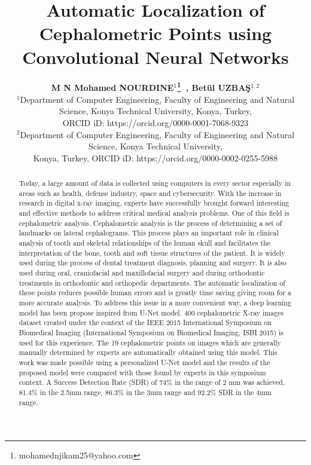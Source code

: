 \documentclass{elektr}
\title{Automatic Localization of Cephalometric Points using Convolutional Neural Networks}
\author[M N Mohamed NOURDINE and Betül UZBAŞ]{
\textbf{M N Mohamed NOURDINE$^{1}$\thanks{mohamednjikam25@yahoo.com}~, Betül UZBAŞ$^{1,2}$}\\
$^{1}$Department of Computer Engineering, Faculty of Engineering and Natural Science, Konya Technical University, Konya, Turkey, \\ ORCID iD: https://orcid.org/0000-0001-7068-9323\\
$^{2}$Department of Computer Engineering, Faculty of Engineering and Natural Science, Konya Technical University,\\ Konya, Turkey, ORCID iD: https://orcid.org/0000-0002-0255-5988
\\ [1.8em]

\rec{.201}
\acc{.201}
\finv{..201}
}
\begin{document}
\maketitle


\begin{abstract}Today, a large amount of data is collected using computers in every sector especially in areas such as health, defense industry, space and cybersecurity. With the increase in research in digital x-ray imaging, experts have successfully brought forward interesting and effective methods to address critical medical analysis problems. One of this field is cephalometric analysis. Cephalometric analysis is the process of determining a set of landmarks on lateral cephalograms. This process plays an important role in clinical analysis of tooth and skeletal relationships of the human skull and facilitates the interpretation of the bone, tooth and soft tissue structures of the patient. It is widely used during the process of dental treatment diagnosis, planning and surgery. It is also used during oral, craniofacial and maxillofacial surgery and during orthodontic treatments in orthodontic and orthopedic departments. The automatic localization of these points reduces possible human errors and is greatly time saving giving room for a more accurate analysis. To address this issue in a more convenient way, a deep learning model has been propose inspired from U-Net model. 400 cephalometric X-ray images dataset created under the context of the IEEE 2015 International Symposium on Biomedical Imaging (International Symposium on Biomedical Imaging, ISBI 2015) is used for this experience. The 19 cephalometric points on images which are generally manually determined by experts are automatically obtained using this model. This work was made possible using a personalized U-Net model and the results of the proposed model were compared with those found by experts in this symposium context. A Success Detection Rate (SDR) of 74$\%$  in the range of 2 mm was achieved, 81.4$\%$  in the 2.5mm range, 86.3$\%$  in the 3mm range and 92.2$\%$  SDR in the 4mm range.
	

\end{abstract}
\end{document}
